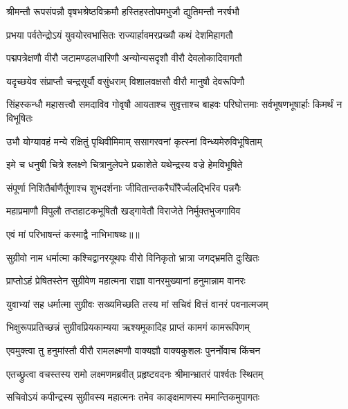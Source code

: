 \twolineshloka
{श्रीमन्तौ रूपसंपन्नौ वृषभश्रेष्ठविक्रमौ}
{हस्तिहस्तोपमभुजौ द्युतिमन्तौ नरर्षभौ} %

\twolineshloka
{प्रभया पर्वतेन्द्रोऽयं युवयोरवभासितः}
{राज्यार्हावमरप्रख्यौ कथं देशमिहागतौ} %

\twolineshloka
{पद्मपत्रेक्षणौ वीरौ जटामण्डलधारिणौ}
{अन्योन्यसदृशौ वीरौ देवलोकादिवागतौ} %

\twolineshloka
{यदृच्छयेव संप्राप्तौ चन्द्रसूर्यौ वसुंधराम्}
{विशालवक्षसौ वीरौ मानुषौ देवरूपिणौ} %

\threelineshloka
{सिंहस्कन्धौ महासत्त्वौ समदाविव गोवृषौ}
{आयताश्च सुवृत्ताश्च बाहवः परिघोत्तमाः}
{सर्वभूषणभूषार्हाः किमर्थं न विभूषितः} %

\twolineshloka
{उभौ योग्यावहं मन्ये रक्षितुं पृथिवीमिमाम्}
{ससागरवनां कृत्स्नां विन्ध्यमेरुविभूषिताम्} %

\twolineshloka
{इमे च धनुषी चित्रे श्लक्ष्णे चित्रानुलेपने}
{प्रकाशेते यथेन्द्रस्य वज्रे हेमविभूषिते} %

\twolineshloka
{संपूर्णा निशितैर्बाणैर्तूणाश्च शुभदर्शनाः}
{जीवितान्तकरैर्घोरैर्ज्वलद्भिरिव पन्नगैः} %

\twolineshloka
{महाप्रमाणौ विपुलौ तप्तहाटकभूषितौ}
{खड्गावेतौ विराजेते निर्मुक्तभुजगाविव} %

{एवं मां परिभाषन्तं कस्माद्वै नाभिभाषथः॥॥} %

\addtocounter{shlokacount}{1}

\twolineshloka
{सुग्रीवो नाम धर्मात्मा कश्चिद्वानरयूथपः}
{वीरो विनिकृतो भ्रात्रा जगद्भ्रमति दुःखितः} %

\twolineshloka
{प्राप्तोऽहं प्रेषितस्तेन सुग्रीवेण महात्मना}
{राज्ञा वानरमुख्यानां हनुमान्नाम वानरः} %

\twolineshloka
{युवाभ्यां सह धर्मात्मा सुग्रीवः सख्यमिच्छति}
{तस्य मां सचिवं वित्तं वानरं पवनात्मजम्} %

\twolineshloka
{भिक्षुरूपप्रतिच्छन्नं सुग्रीवप्रियकाम्यया}
{ऋश्यमूकादिह प्राप्तं कामगं कामरूपिणम्} %

\twolineshloka
{एवमुक्त्वा तु हनुमांस्तौ वीरौ रामलक्ष्मणौ}
{वाक्यज्ञौ वाक्यकुशलः पुनर्नोवाच किंचन} %

\twolineshloka
{एतच्छ्रुत्वा वचस्तस्य रामो लक्ष्मणमब्रवीत्}
{प्रहृष्टवदनः श्रीमान्भ्रातरं पार्श्वतः स्थितम्} %

\twolineshloka
{सचिवोऽयं कपीन्द्रस्य सुग्रीवस्य महात्मनः}
{तमेव काङ्क्षमाणस्य ममान्तिकमुपागतः} %

